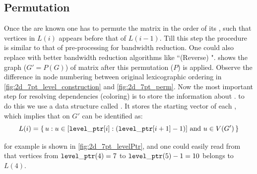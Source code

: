 \subsection{Permutation}\label{subsec:PERM}
Once the \levels are known one has to permute the matrix in the order of its \levels, such that vertices in $L(i)$ appears before that of $L(i-1)$. Till this step the procedure is similar to that of \BFS pre-processing for bandwidth reduction. One could also replace \BFS with better bandwidth reduction algorithms like ``(Reverse) \CMfull".  shows the graph ($G' = P(G)$) of \STEX matrix after this permutation ($P$) is applied. Observe the difference in node numbering between original lexicographic ordering in \cref{fig:2d_7pt_level_construction} and \cref{fig:2d_7pt_perm}. Now the most important step for resolving dependencies (coloring) is to store the information about \levels. \Inorder to do this we use a data structure called \levelPtr. It stores the starting vector of each \levels, which implies that \levels on $G'$ can be identified as:
\begin{equation*}
	L(i) = \set{ u : u \in [{\tt level\_ptr} [i]:({\tt level\_ptr} [i+1]-1)] \text{ and } u \in V(G')}
\end{equation*}

 \levelPtr for \STEX example is shown in \cref{fig:2d_7pt_levelPtr}, and one could easily read from \levelPtr that vertices from ${\tt level\_ptr}(4)=7$ to ${\tt level\_ptr}(5)-1=10$ belongs to $L(4)$.
 
 
